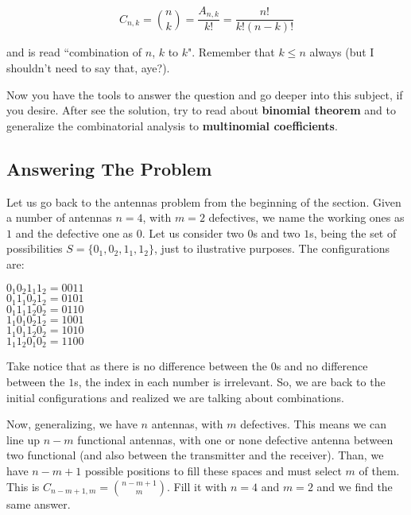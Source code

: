 \documentclass[a4paper,twocolumn]{article}
\begin{document}
\begin{equation}
\label{eq:combination}
C_{n,k} = \binom{n}{k} = \frac{A_{n,k}}{k!} = \frac{n!}{k!(n - k)!}
\end{equation}

\noindent and is read ``combination of $n$, $k$ to $k$". Remember that $k \leq n$ always (but I shouldn't need to say that, aye?).

Now you have the tools to answer the question and go deeper into this subject, if you desire. After see the solution, try to read about \textbf{binomial theorem} and to generalize the combinatorial analysis to \textbf{multinomial coefficients}.


\subsection{Answering The Problem}
\label{subsec:answer-comb-anal}

Let us go back to the antennas problem from the beginning of the section. Given a number of antennas $n = 4$, with $m = 2$ defectives, we name the working ones as $1$ and the defective one as $0$. Let us consider two $0$s and two $1$s, being the set of possibilities $S = \{0_1, 0_2, 1_1, 1_2\}$, just to ilustrative purposes. The configurations are:

\begin{center}
$0_1 0_2 1_1 1_2 = 0 0 1 1$\\
$0_1 1_1 0_2 1_2 = 0 1 0 1$\\
$0_1 1_1 1_2 0_2 = 0 1 1 0$\\
$1_1 0_1 0_2 1_2 = 1 0 0 1$\\
$1_1 0_1 1_2 0_2 = 1 0 1 0$\\
$1_1 1_2 0_1 0_2 = 1 1 0 0$\\
\end{center}

\noindent Take notice that as there is no difference between the $0$s and no difference between the $1$s, the index in each number is irrelevant. So, we are back to the initial configurations and realized we are talking about combinations.

Now, generalizing, we have $n$ antennas, with $m$ defectives. This means we can line up $n - m$ functional antennas, with one or none defective antenna between two functional (and also between the transmitter and the receiver). Than, we have $n - m + 1$ possible positions to fill these spaces and must select $m$ of them. This is $C_{n - m + 1,m} = \binom{n - m + 1}{m}$. Fill it with $n = 4$ and $m = 2$ and we find the same answer.
\end{document}
